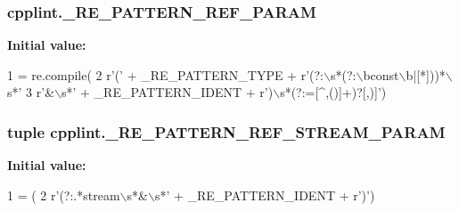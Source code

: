 \subsubsection[{\texorpdfstring{\+\_\+\+R\+E\+\_\+\+P\+A\+T\+T\+E\+R\+N\+\_\+\+R\+E\+F\+\_\+\+P\+A\+R\+AM}{_RE_PATTERN_REF_PARAM}}]{\setlength{\rightskip}{0pt plus 5cm}cpplint.\+\_\+\+R\+E\+\_\+\+P\+A\+T\+T\+E\+R\+N\+\_\+\+R\+E\+F\+\_\+\+P\+A\+R\+AM\hspace{0.3cm}{\ttfamily [private]}}\hypertarget{namespacecpplint_ab1ef73db80238ad8d42561df04d77920}{}\label{namespacecpplint_ab1ef73db80238ad8d42561df04d77920}
{\bfseries Initial value\+:}
\begin{DoxyCode}
1 = re.compile(
2     \textcolor{stringliteral}{r'('} + \_RE\_PATTERN\_TYPE + \textcolor{stringliteral}{r'(?:\(\backslash\)s*(?:\(\backslash\)bconst\(\backslash\)b|[*]))*\(\backslash\)s*'}
3     \textcolor{stringliteral}{r'&\(\backslash\)s*'} + \_RE\_PATTERN\_IDENT + \textcolor{stringliteral}{r')\(\backslash\)s*(?:=[^,()]+)?[,)]'})
\end{DoxyCode}
\subsubsection[{\texorpdfstring{\+\_\+\+R\+E\+\_\+\+P\+A\+T\+T\+E\+R\+N\+\_\+\+R\+E\+F\+\_\+\+S\+T\+R\+E\+A\+M\+\_\+\+P\+A\+R\+AM}{_RE_PATTERN_REF_STREAM_PARAM}}]{\setlength{\rightskip}{0pt plus 5cm}tuple cpplint.\+\_\+\+R\+E\+\_\+\+P\+A\+T\+T\+E\+R\+N\+\_\+\+R\+E\+F\+\_\+\+S\+T\+R\+E\+A\+M\+\_\+\+P\+A\+R\+AM\hspace{0.3cm}{\ttfamily [private]}}\hypertarget{namespacecpplint_a63664d5c5cd3b497c1eacb53048674e3}{}\label{namespacecpplint_a63664d5c5cd3b497c1eacb53048674e3}
{\bfseries Initial value\+:}
\begin{DoxyCode}
1 = (
2     \textcolor{stringliteral}{r'(?:.*stream\(\backslash\)s*&\(\backslash\)s*'} + \_RE\_PATTERN\_IDENT + \textcolor{stringliteral}{r')'})
\end{DoxyCode}
